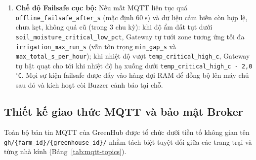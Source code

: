\begin{enumerate}[leftmargin=*]
    \item \textbf{Chế độ Failsafe cục bộ:} Nếu mất MQTT liên tục quá \texttt{offline\_failsafe\_after\_s} (mặc định \(60\;\text{s}\)) và dữ liệu cảm biến còn hợp lệ, chưa kẹt, không quá cũ (trong 3 chu kỳ): khi độ ẩm đất tụt dưới \texttt{soil\_moisture\_critical\_low\_pct}, Gateway tự tưới zone tương ứng tối đa \texttt{irrigation\_max\_run\_s} (vẫn tôn trọng \texttt{min\_gap\_s} và \texttt{max\_total\_s\_per\_hour}); khi nhiệt độ vượt \texttt{temp\_critical\_high\_c}, Gateway tự bật quạt cho tới khi nhiệt độ hạ xuống dưới \texttt{temp\_critical\_high\_c - 2,0 \(^\circ\)C}. Mọi sự kiện failsafe được đẩy vào hàng đợi RAM để đồng bộ lên máy chủ sau đó và kích hoạt còi Buzzer cảnh báo tại chỗ.
\end{enumerate}

\subsection{Thiết kế giao thức MQTT và bảo mật Broker}
\label{subsec:c3-mqtt}

Toàn bộ bản tin MQTT của GreenHub được tổ chức dưới tiền tố không gian tên \texttt{gh/\{farm\_id\}/\{greenhouse\_id\}/} nhằm tách biệt tuyệt đối giữa các trang trại và từng nhà kính (Bảng~\ref{tab:mqtt-topics}).

